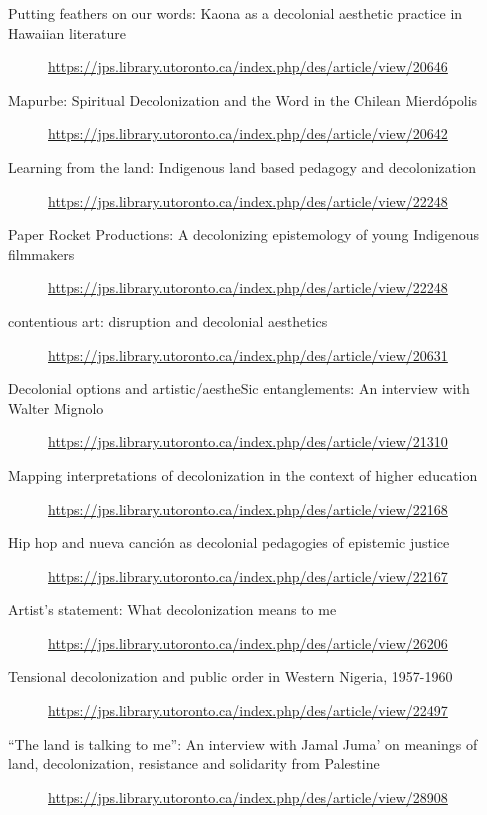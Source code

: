 \documentclass[11pt]{article}
\begin{document}
\begin{itemize}
\begin{description}
\item[{Putting feathers on our words: Kaona as a decolonial aesthetic practice in Hawaiian literature}] \url{https://jps.library.utoronto.ca/index.php/des/article/view/20646}

\item[{Mapurbe: Spiritual Decolonization and the Word in the Chilean Mierdópolis}] \url{https://jps.library.utoronto.ca/index.php/des/article/view/20642}

\item[{Learning from the land: Indigenous land based pedagogy and decolonization}] \url{https://jps.library.utoronto.ca/index.php/des/article/view/22248}

\item[{Paper Rocket Productions: A decolonizing epistemology of young Indigenous filmmakers}] \url{https://jps.library.utoronto.ca/index.php/des/article/view/22248}

\item[{contentious art: disruption and decolonial aesthetics}] \url{https://jps.library.utoronto.ca/index.php/des/article/view/20631}

\item[{Decolonial options and artistic/aestheSic entanglements: An interview with Walter Mignolo}] \url{https://jps.library.utoronto.ca/index.php/des/article/view/21310}

\item[{Mapping interpretations of decolonization in the context of higher education}] \url{https://jps.library.utoronto.ca/index.php/des/article/view/22168}

\item[{Hip hop and nueva canción as decolonial pedagogies of epistemic justice}] \url{https://jps.library.utoronto.ca/index.php/des/article/view/22167}

\item[{Artist's statement: What decolonization means to me}] \url{https://jps.library.utoronto.ca/index.php/des/article/view/26206}

\item[{Tensional decolonization and public order in Western Nigeria, 1957-1960}] \url{https://jps.library.utoronto.ca/index.php/des/article/view/22497}

\item[{“The land is talking to me”: An interview with Jamal Juma’ on meanings of land, decolonization, resistance and solidarity from Palestine}] \url{https://jps.library.utoronto.ca/index.php/des/article/view/28908}


\end{description}
\end{itemize}
\end{document}
